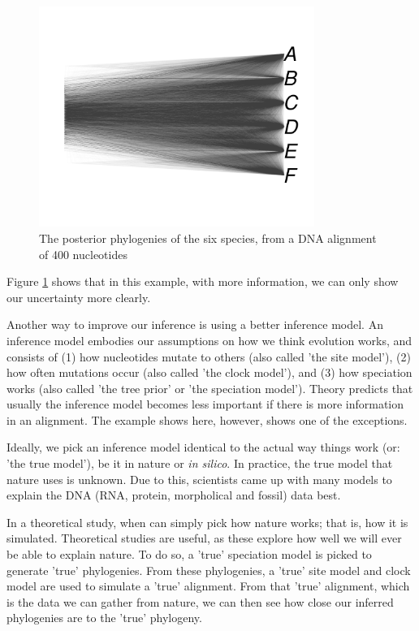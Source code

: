 \begin{figure}[H]
  \includegraphics[width=0.8\textwidth]{densitree_400.png}
  \caption{
    The posterior phylogenies of the six species,
    from a DNA alignment of 400 nucleotides
  }
  \label{fig:densitree_again}
\end{figure}

Figure \ref{fig:densitree_again} shows that in this example,
with more information, we can only show our uncertainty more clearly. 

Another way to improve our inference is using a better inference model.
An inference model embodies our assumptions on how we think evolution
works, and consists of (1) how nucleotides mutate to others (also
called 'the site model'), (2) how often mutations occur (also 
called 'the clock model'), and (3) how speciation works (also 
called 'the tree prior' or 'the speciation model'). 
Theory predicts that usually the inference model becomes less important
if there is more information in an alignment. The example shows here,
however, shows one of the exceptions.

Ideally, we pick an inference model identical to the actual way things 
work (or: 'the true model'), be it in nature
or \textit{in silico}. In practice, the true model that nature uses is unknown.
Due to this, scientists came up with many models to explain the 
DNA (RNA, protein, morpholical and fossil) data best.

In a theoretical study, when can simply pick how nature works; that is,
how it is simulated. Theoretical studies are useful, as these explore
how well we will ever be able to explain nature. To do so, a 'true' 
speciation model is picked to generate 'true' phylogenies. 
From these phylogenies, a 'true' site model and clock model are used to
simulate a 'true' alignment. From that 'true' alignment, which is the
data we can gather from nature, we can then see how close our inferred
phylogenies are to the 'true' phylogeny.

